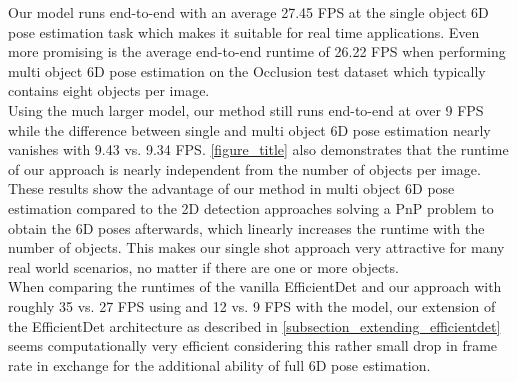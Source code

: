 \documentclass[twocolumn, 10pt, letterpaper]{article}
\begin{document}
Our  model runs end-to-end with an average 27.45 FPS at the single object 6D pose estimation task which makes it suitable for real time applications. Even more promising is the average end-to-end runtime of 26.22 FPS when performing multi object 6D pose estimation on the Occlusion test dataset which typically contains eight objects per image.\\ Using the much larger  model, our method still runs end-to-end at over 9 FPS while the difference between single and multi object 6D pose estimation nearly vanishes with 9.43 vs. 9.34 FPS. \autoref{figure_title} also demonstrates that the runtime of our approach is nearly independent from the number of objects per image. These results show the advantage of our method in multi object 6D pose estimation compared to the 2D detection approaches solving a PnP problem to obtain the 6D poses afterwards, which linearly increases the runtime with the number of objects. This makes our single shot approach very attractive for many real world scenarios, no matter if there are one or more objects.\\
When comparing the runtimes of the vanilla EfficientDet and our approach with roughly 35 vs. 27 FPS using  and 12 vs. 9 FPS with the  model, our extension of the EfficientDet architecture as described in \autoref{subsection_extending_efficientdet} seems computationally very efficient considering this rather small drop in frame rate in exchange for the additional ability of full 6D pose estimation.
\end{document}
